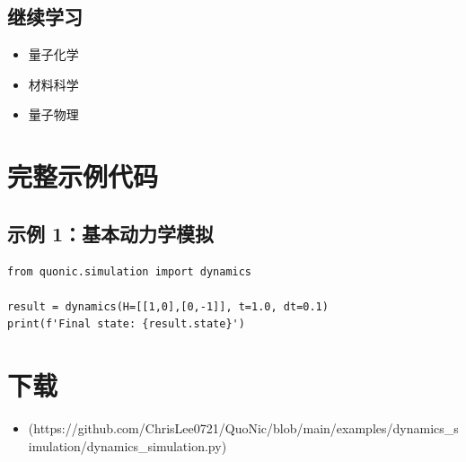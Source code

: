 \documentclass[12pt,a4paper]{article}
\begin{document}
\subsection{继续学习}
\begin{itemize}
  \item 量子化学
  \item 材料科学
  \item 量子物理
\end{itemize}

\section{完整示例代码}

\subsection{示例 1：基本动力学模拟}

\begin{verbatim}
from quonic.simulation import dynamics

result = dynamics(H=[[1,0],[0,-1]], t=1.0, dt=0.1)
print(f'Final state: {result.state}')
\end{verbatim}

\section{下载}

\begin{itemize}
  \item [dynamics\_simulation.py](https://github.com/ChrisLee0721/QuoNic/blob/main/examples/dynamics_simulation/dynamics_simulation.py)
\end{itemize}
\end{document}
